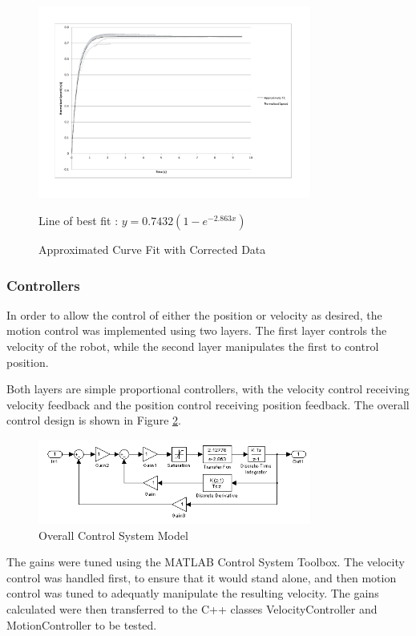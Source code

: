 \documentclass[10pt]{article}
\begin{document}
\begin{figure}
 \centering
 \includegraphics[width=0.8\textwidth]{Images/approximate-fit-model-time-shift}
 \caption{Approximated Curve Fit with Corrected Data}
 \label{fig:approximateFitTimeShiftRemoved}

 Line of best fit : $y=0.7432 \left(1-e^{-2.863x}\right)$
\end{figure}

\subsubsection{Controllers}

In order to allow the control of either the position or velocity as desired, the
motion control was implemented using two layers.  The first layer controls the
velocity of the robot, while the second layer manipulates the first to control
position.

Both layers are simple proportional controllers, with the velocity control
receiving velocity feedback and the position control receiving position
feedback.  The overall control design is shown in Figure
\ref{fig:overalController}.

\begin{figure}
 \includegraphics[width=0.8\textwidth]{Images/main-model}
 \caption{Overall Control System Model}
 \label{fig:overalController}
\end{figure}

The gains were tuned using the MATLAB Control System Toolbox. The velocity
control was handled first, to ensure that it would stand alone, and then motion
control was tuned to adequatly manipulate the resulting velocity.  The gains
calculated were then transferred to the C++ classes VelocityController and
MotionController to be tested.
\end{document}
